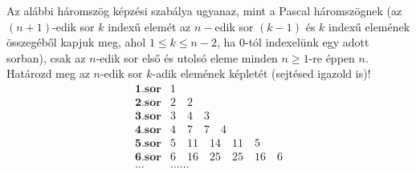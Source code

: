 \vspace{0.3cm}

\begin{problem}
Az alábbi háromszög képzési szabálya ugyanaz, mint a Pascal háromszögnek
(az $(n+1)$-edik sor $k$ indexű elemét az $n-$edik sor $(k-1)$
és $k$ indexű elemének összegéből kapjuk meg, ahol $1\leq k\leq n-2$,
ha $0$-tól indexelünk egy adott sorban), csak az $n$-edik sor első
és utolsó eleme minden $n\geq1$-re éppen $n$. Határozd meg az $n$-edik
sor $k$-adik elemének képletét (sejtésed igazold is)! 
\[
\begin{array}{rc}
\textbf{1.sor} & 1\\
\textbf{2.sor} & 2\quad2\\
\textbf{3.sor} & 3\quad4\quad3\\
\textbf{4.sor} & 4\quad7\quad7\quad4\\
\textbf{5.sor} & 5\quad11\quad14\quad11\quad5\\
\textbf{6.sor} & 6\quad16\quad25\quad25\quad16\quad6\\
\ldots & \ldots\ldots
\end{array}
\]
\end{problem}

